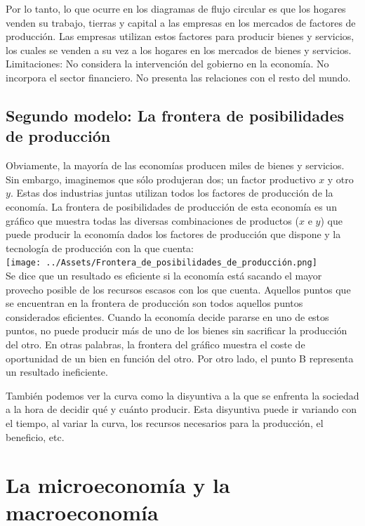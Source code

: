 \documentclass{report}
\begin{document}
{\footnotesize Por lo tanto, lo que ocurre en los diagramas de flujo circular es que los hogares venden su trabajo, tierras y capital a las empresas en los mercados de factores de producción. 
Las empresas utilizan estos factores para producir bienes y servicios, los cuales se venden a su vez a los hogares en los mercados de bienes y servicios. Limitaciones: No considera la intervención del gobierno en la economía. No incorpora el sector financiero. No presenta las relaciones con el resto del mundo.} \\

\subsection{Segundo modelo: La frontera de posibilidades de producción}
Obviamente, la mayoría de las economías producen miles de bienes y servicios. Sin embargo, imaginemos que sólo produjeran dos; un factor productivo \(x\) y otro \(y\). Estas dos industrias juntas utilizan todos los factores de producción de la economía. La frontera de posibilidades de producción de esta economía es un gráfico que muestra todas las diversas combinaciones de productos (\(x\) e \(y\)) que puede producir la economía dados los factores de producción que dispone y la tecnología de producción con la que cuenta: \\

\texttt{[image: ../Assets/Frontera\_de\_posibilidades\_de\_producción.png]} \\

Se dice que un resultado es eficiente si la economía está sacando el mayor provecho posible de los recursos escasos con los que cuenta. Aquellos puntos que se encuentran en la frontera de producción son todos aquellos puntos considerados eficientes. Cuando la economía decide pararse en uno de estos puntos, no puede producir más de uno de los bienes sin sacrificar la producción del otro. En otras palabras, la frontera del gráfico muestra el coste de oportunidad de un bien en función del otro. Por otro lado, el punto B representa un resultado ineficiente.

También podemos ver la curva como la disyuntiva a la que se enfrenta la sociedad a la hora de decidir qué y cuánto producir. Esta disyuntiva puede ir variando con el tiempo, al variar la curva, los recursos necesarios para la producción, el beneficio, etc.

\section{La microeconomía y la macroeconomía}
\end{document}
